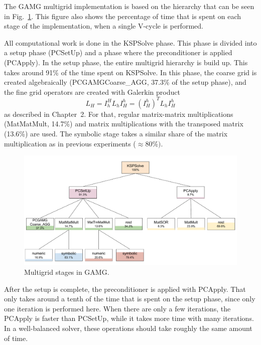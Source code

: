 The GAMG multigrid implementation is based on the hierarchy that can be seen in Fig.~\ref{fig:multigrid_hierarchy_gamg}. This figure also shows the percentage of time that is spent on each stage of the implementation, when a single V-cycle is performed. 

All computational work is done in the KSPSolve phase. This phase is divided into a setup phase (PCSetUp) and a phase where the preconditioner is applied (PCApply). In the setup phase, the entire multigrid hierarchy is build up. This takes around 91\% of the time spent on KSPSolve. In this phase, the coarse grid is created algebraically (PCGAMGCoarse\_AGG, 37.3\% of the setup phase), and the fine grid operators are created with Galerkin product
\begin{equation}
L_H = I_h^H L_h I_H^h = (I_H^h)^T L_h I_H^h
\end{equation}
as described in Chapter~2. For that, regular matrix-matrix multiplications (MatMatMult, 14.7\%) and matrix multiplications with the transposed matrix (13.6\%) are used. The symbolic stage takes a similar share of the matrix multiplication as in previous experiments ($\approx 80\%)$.

\begin{figure}[tbp]
	\centering
	\hspace*{-7mm}\includegraphics[width=1.1\textwidth]{Multigrid_hierarchy_GAMG}
	\caption{Multigrid stages in GAMG.} 
	\label{fig:multigrid_hierarchy_gamg}
\end{figure}

After the setup is complete, the preconditioner is applied with PCApply. That only takes around a tenth of the time that is spent on the setup phase, since only one iteration is performed here. When there are only a few iterations, the PCApply is faster than PCSetUp, while it takes more time with many iterations. In a well-balanced solver, these operations should take roughly the same amount of time. 

